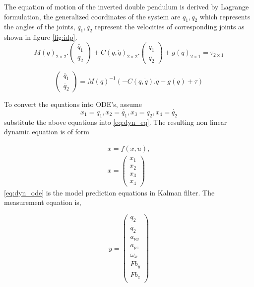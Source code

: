 The equation of motion of the inverted double pendulum is derived by Lagrange formulation, the generalized coordinates of the system are $q_1,q_2$ which represents the angles of the joints, $\dot{q_1},\dot{q_2}$ represent the velocities of corresponding joints as shown in figure \ref{fig:idp}.
\begin{equation}
	M(q)_{2\times2}.
	\begin{pmatrix}
		\ddot{q_{1}} \\
		\ddot{q_{2}} 
	\end{pmatrix}
	+ C(q,\dot{q})_{2\times2}.
	\begin{pmatrix}
		\dot{q_{1}} \\
		\dot{q_{2}} 
	\end{pmatrix}
	+ g(q)_{2\times 1} = \tau_{2\times 1}
\end{equation}

\begin{equation}
	\label{eq:dyn_eq}
	\begin{pmatrix}
		\ddot{q_{1}} \\
		\ddot{q_{2}} 
		\end{pmatrix}
	= M(q)^{-1} \left( -C(q,\dot{q}).\dot{q} - g(q) + \tau \right )
\end{equation}

To convert the equations into ODE's, assume 
$$ x_1 = q_1, x_2 = \dot{q_1}, x_3 = q_2, x_4 = \dot{q_2}$$
substitute the above equations into \eqref{eq:dyn_eq}. The resulting non linear dynamic equation is of form

\begin{equation}
\begin{split}\label{eq:dyn_ode}
	\dot{x}  = f(x,u),	\\
	x = 
	\begin{pmatrix}
		x_1 \\
		x_2 \\
		x_3 \\
		x_4
	\end{pmatrix}
\end{split}
\end{equation}
\eqref{eq:dyn_ode} is the model prediction equations in Kalman filter. The measurement equation is,

\begin{equation}
	y= 
	\begin{pmatrix}
		q_2\\
		\dot{q_2}\\
		a_{py}\\
		a_{pz}\\
		\omega_x\\
		Fb_y\\
		Fb_z \\
	\end{pmatrix}
\end{equation}

